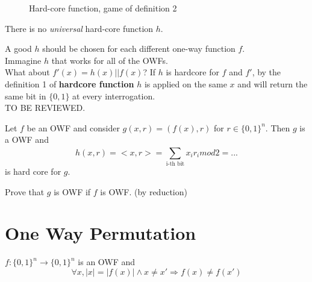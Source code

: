 \begin{figure}[h!]
   \centering
   \sdinit{}
   \caption{Hard-core function, game of definition 2}
   \label{fig:def2hcf}
\end{figure}

\begin{clm}
    There is no \textit{universal} hard-core function $h$.
\end{clm}
A good $h$ should be chosen for each different one-way function $f$.\\
Immagine $h$ that works for all of the OWFs.\\
What about $f'(x)=h(x)||f(x)$? If $h$ is hardcore for $f$ and $f'$, by the
definition 1 of \textbf{hardcore function} $h$ is applied on the same $x$ and
will return the same bit in $\{0,1\}$ at every interrogation.\\
TO BE REVIEWED.

\begin{theorem}
    Let $f$ be an OWF and consider $g(x,r)=(f(x), r)$ for $r \in \{0,1\}^{n}$.
    Then $g$ is a OWF and 
    \[ h(x,r)=<x,r>= \sum_{\text{i-th bit}}^{}x_{i}r_{i} mod2 = ...\]
    is hard core for $g$.
\end{theorem}

\begin{exercise}
    Prove that $g$ is OWF if $f$ is OWF. (by reduction)
\end{exercise}

\section{One Way Permutation}
$f:{\{0,1\}^{n}} \to {\{0,1\}^{n}} $ is an OWF and 
\[
    \forall x, |x|=|f(x)| \wedge  x \not= x' \Rightarrow f(x) \not= f(x')
\]

